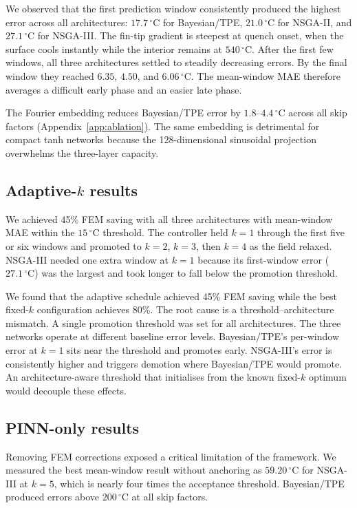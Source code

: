 We observed that the first prediction window consistently produced the highest error across all
architectures: $17.7\,^\circ\mathrm{C}$ for Bayesian/TPE, $21.0\,^\circ\mathrm{C}$
for NSGA-II, and $27.1\,^\circ\mathrm{C}$ for NSGA-III.
The fin-tip gradient is steepest at quench onset, when the surface cools
instantly while the interior remains at $540\,^\circ\mathrm{C}$.
After the first few windows, all three architectures settled to steadily
decreasing errors.
By the final window they reached $6.35$, $4.50$, and $6.06\,^\circ\mathrm{C}$.
The mean-window MAE therefore averages a difficult early phase and an easier
late phase.

The Fourier embedding reduces Bayesian/TPE error by $1.8$--$4.4\,^\circ\mathrm{C}$
across all skip factors (Appendix~\ref{app:ablation}).
The same embedding is detrimental for compact tanh networks because the
128-dimensional sinusoidal projection overwhelms the three-layer capacity.

\subsection{Adaptive-$k$ results}

We achieved 45\% FEM saving with all three architectures with mean-window MAE within the
$15\,^\circ\mathrm{C}$ threshold.
The controller held $k=1$ through the first five or six windows and promoted
to $k=2$, $k=3$, then $k=4$ as the field relaxed.
NSGA-III needed one extra window at $k=1$ because its first-window error
($27.1\,^\circ\mathrm{C}$) was the largest and took longer to fall below the
promotion threshold.

We found that the adaptive schedule achieved 45\% FEM saving while the best
fixed-$k$ configuration achieves 80\%.
The root cause is a threshold--architecture mismatch.
A single promotion threshold was set for all architectures.
The three networks operate at different baseline error levels.
Bayesian/TPE's per-window error at $k=1$ sits near the threshold and promotes
early.
NSGA-III's error is consistently higher and triggers demotion where
Bayesian/TPE would promote.
An architecture-aware threshold that initialises from the known fixed-$k$ optimum
would decouple these effects.

\subsection{PINN-only results}

Removing FEM corrections exposed a critical limitation of the framework.
We measured the best mean-window result without anchoring as $59.20\,^\circ\mathrm{C}$
for NSGA-III at $k=5$, which is nearly four times the acceptance threshold.
Bayesian/TPE produced errors above $200\,^\circ\mathrm{C}$ at all skip factors.

